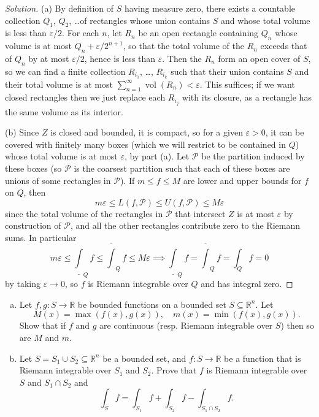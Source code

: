 \documentclass[10pt]{scrartcl}
\providecommand{\ol}{\overline}
\providecommand{\eps}{\varepsilon}
\providecommand{\RR}{\mathbb R}
\providecommand{\ii}{\item}
\newenvironment{soln}{\begin{proof}[Solution]}{\end{proof}}
\begin{document}
\begin{soln}
	(a) By definition of $S$ having measure zero, there exists a
	countable collection $Q_1$, $Q_2$, \dots of rectangles
	whose union contains $S$ and whose total volume is less than $\eps/2$.
	For each $n$, let $R_n$ be an open rectangle containing $Q_n$
	whose volume is at most $Q_n + \eps/2^{n+1}$, so that
	the total volume of the $R_n$ exceeds that of $Q_n$ by at most $\eps/2$,
	hence is less than $\eps$. Then the $R_n$ form an open cover of $S$,
	so we can find a finite collection $R_{i_1}$, \dots, $R_{i_k}$
	such that their union contains $S$ and their total volume is at most
	$\sum_{n=1}^\infty \operatorname{vol}(R_n) < \eps$.
	This suffices; if we want closed rectangles then
	we just replace each $R_{i_j}$ with its closure, as a rectangle
	has the same volume as its interior.
	
	(b) Since $Z$ is closed and bounded,
	it is compact, so for a given $\eps>0$,
	it can be covered with finitely many boxes
	(which we will restrict to be contained in $Q$)
	whose total volume is at most $\eps$, by part (a).
	Let $\mathcal P$ be the partition induced by these boxes
	(so $\mathcal P$ is the coarsest partition such that each of these boxes
	are unions of some rectangles in $\mathcal P$).
	If $m \le f \le M$ are lower and upper bounds for $f$ on $Q$, then
	\[m\eps \le L(f,\mathcal P) \le U(f,\mathcal P)\le M\eps\]
	since the total volume of the rectangles in $\mathcal P$ that intersect $Z$
	is at most $\eps$ by construction of $\mathcal P$,
	and all the other rectangles contribute zero to the Riemann sums.
	In particular
	\[m\eps\le \underline\int_Qf\le\ol\int_Qf\le M\eps
	\implies \underline\int_Qf=\ol\int_Qf=\int_Qf=0\]
	by taking $\eps\to 0$,
	so $f$ is Riemann integrable over $Q$ and has integral zero.
\end{soln}

\begin{problem}
	\begin{enumerate}[(a)]
		\ii Let $f,g\colon S\to\RR$ be bounded functions on a bounded set
		$S\subseteq\RR^n$. Let
		\[M(x) = \max(f(x),g(x)),\quad m(x)=\min(f(x),g(x)).\]
		Show that if $f$ and $g$ are continuous
		(resp. Riemann integrable over $S$)
		then so are $M$ and $m$.
		\ii Let $S = S_1\cup S_2\subseteq\RR^n$ be a bounded set,
		and $f\colon S\to\RR$ be a function that is
		Riemann integrable over $S_1$ and $S_2$. Prove that
		$f$ is Riemann integrable over $S$ and $S_1\cap S_2$ and
		\[\int_Sf=\int_{S_1}f+\int_{S_2}f-\int_{S_1\cap S_2}f.\]
	\end{enumerate}
\end{problem}
\end{document}
